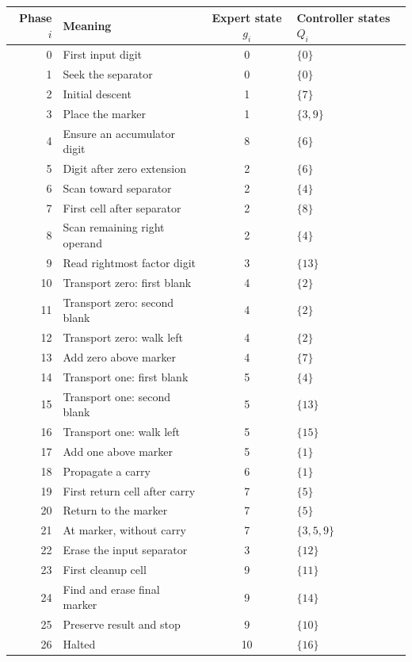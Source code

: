 \documentclass[11pt,a4paper]{article}
\begin{document}
\begin{center}
\small\renewcommand{\arraystretch}{1.18}
\begin{tabular}{r l c l}
\toprule
\rowcolor{Pale}Phase $i$ & Meaning & Expert state $g_i$ & Controller states $Q_i$\\
\midrule
0 & First input digit & 0 & $\{0\}$ \\
1 & Seek the separator & 0 & $\{0\}$ \\
2 & Initial descent & 1 & $\{7\}$ \\
3 & Place the marker & 1 & $\{3,9\}$ \\
4 & Ensure an accumulator digit & 8 & $\{6\}$ \\
5 & Digit after zero extension & 2 & $\{6\}$ \\
6 & Scan toward separator & 2 & $\{4\}$ \\
7 & First cell after separator & 2 & $\{8\}$ \\
8 & Scan remaining right operand & 2 & $\{4\}$ \\
9 & Read rightmost factor digit & 3 & $\{13\}$ \\
10 & Transport zero: first blank & 4 & $\{2\}$ \\
11 & Transport zero: second blank & 4 & $\{2\}$ \\
12 & Transport zero: walk left & 4 & $\{2\}$ \\
13 & Add zero above marker & 4 & $\{7\}$ \\
14 & Transport one: first blank & 5 & $\{4\}$ \\
15 & Transport one: second blank & 5 & $\{13\}$ \\
16 & Transport one: walk left & 5 & $\{15\}$ \\
17 & Add one above marker & 5 & $\{1\}$ \\
18 & Propagate a carry & 6 & $\{1\}$ \\
19 & First return cell after carry & 7 & $\{5\}$ \\
20 & Return to the marker & 7 & $\{5\}$ \\
21 & At marker, without carry & 7 & $\{3,5,9\}$ \\
22 & Erase the input separator & 3 & $\{12\}$ \\
23 & First cleanup cell & 9 & $\{11\}$ \\
24 & Find and erase final marker & 9 & $\{14\}$ \\
25 & Preserve result and stop & 9 & $\{10\}$ \\
26 & Halted & 10 & $\{16\}$ \\
\bottomrule
\end{tabular}
\end{center}
\end{document}
